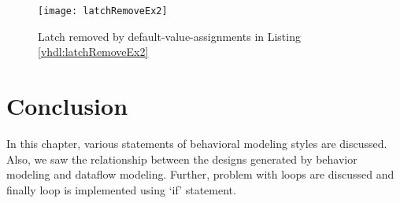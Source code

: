 \begin{figure}
	\centering
	\texttt{[image: latchRemoveEx2]}
	\caption{Latch removed by default-value-assignments in Listing \ref{vhdl:latchRemoveEx2}}
	\label{fig:latchRemoveEx2}
\end{figure}

 
\section{Conclusion}
In this chapter, various statements of behavioral modeling styles are discussed. Also, we saw the relationship between the designs generated by behavior modeling and dataflow modeling. Further, problem with loops are discussed and finally loop is implemented using `if' statement. 